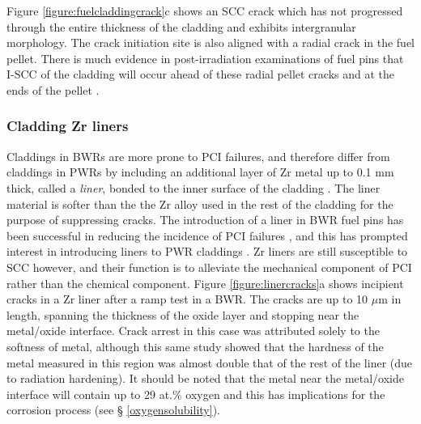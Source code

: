 Figure \ref{figure:fuelcladdingcrack}c shows an SCC crack which has not progressed through the entire thickness of the cladding and exhibits intergranular morphology. The crack initiation site is also aligned with a radial crack in the fuel pellet. There is much evidence in post-irradiation examinations of fuel pins that I-SCC of the cladding will occur ahead of these radial pellet cracks and at the ends of the pellet \cite{Peehs2009, Haddad1983, haynes2015modelling, Wood1975, Nobrega1985, Syrett1981, Shimada1983}.

\subsubsection{Cladding Zr liners}

Claddings in BWRs are more prone to PCI failures, and therefore differ from claddings in PWRs by including an additional layer of Zr metal up to 0.1 mm thick, called a \emph{liner}, bonded to the inner surface of the cladding \cite{Kitano2006, Takagi1996}. The liner material is softer than the the Zr alloy used in the rest of the cladding for the purpose of suppressing cracks. The introduction of a liner in BWR fuel pins has been successful in reducing the incidence of PCI failures \cite{andersson2003fuel, klinger2003experience}, and this has prompted interest in introducing liners to PWR claddings \cite{groeschel2003failure}. Zr liners are still susceptible to SCC however, and their function is to alleviate the mechanical component of PCI rather than the chemical component. Figure \ref{figure:linercracks}a shows incipient cracks in a Zr liner after a ramp test in a BWR. The cracks are up to 10 $\mu$m in length, spanning the thickness of the oxide layer and stopping near the metal/oxide interface. Crack arrest in this case was attributed solely to the softness of metal, although this same study showed that the hardness of the metal measured in this region was almost double that of the rest of the liner (due to radiation hardening). It should be noted that the metal near the metal/oxide interface will contain up to 29 at.\% oxygen and this has implications for the corrosion process (see § \ref{oxygensolubility}).

